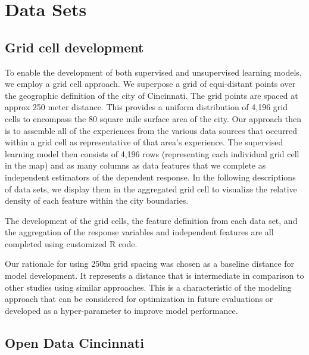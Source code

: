 \documentclass{llncs}
\begin{document}
\section{Data Sets}


\subsection{Grid cell development}

To enable the development of both supervised and unsupervised learning models, we employ a grid cell approach. We superpose a grid of equi-distant points over the geographic definition of the city of Cincinnati. The grid points are spaced at approx 250 meter distance. This provides a uniform distribution of 4,196 grid cells to encompass the 80 square mile surface area of the city. Our approach then is to assemble all of the experiences from the various data sources that occurred within a grid cell as representative of that area's experience. The supervised learning model then consists of 4,196 rows (representing each individual grid cell in the map) and as many columns as data features that we complete as independent estimators of the dependent response. In the following descriptions of data sets, we display them in the aggregated grid cell to visualize the relative density of each feature within the city boundaries. 

The development of the grid cells, the feature definition from each data set, and the aggregation of the response variables and independent features are all completed using customized R code.

Our rationale for using 250m grid spacing was chosen as a baseline distance for model development. It represents a distance that is intermediate in comparison to other studies using similar approaches\cite{xie2017analysis}. This is a characteristic of the modeling approach that can be considered for optimization in future evaluations or developed as a hyper-parameter to improve model performance.


\subsection{Open Data Cincinnati}
\end{document}
